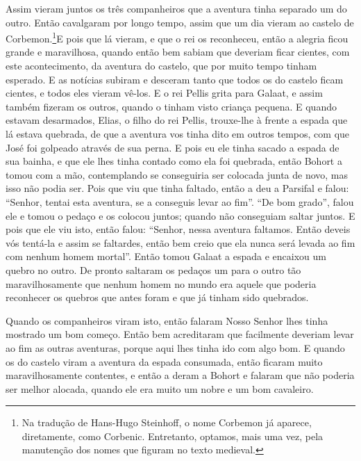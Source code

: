 Assim vieram juntos os três companheiros que a aventura tinha separado um do
outro. Então cavalgaram por longo tempo, assim que um dia vieram ao castelo de
Corbemon.\footnote{ Na tradução de Hans-Hugo Steinhoff, o nome Corbemon já
aparece, diretamente, como Corbenic. Entretanto, optamos, mais uma vez, pela
manutenção dos nomes que figuram no texto medieval.}E pois que lá
vieram, e que o rei os reconheceu, então a alegria ficou grande e maravilhosa,
quando então bem sabiam que deveriam ficar cientes, com este acontecimento, da
aventura do castelo, que por muito tempo tinham esperado. E as notícias subiram
e desceram tanto que todos os do castelo ficam cientes, e todos eles vieram
vê-los. E o rei Pellis grita para Galaat, e assim também fizeram os outros,
quando o tinham visto criança pequena. E quando estavam desarmados, Elias, o
filho do rei Pellis, trouxe-lhe à frente a espada que lá estava quebrada, de
que a aventura vos tinha dito em outros tempos,  com que José foi
golpeado através de sua perna. E pois eu ele tinha sacado a espada de sua
bainha, e que ele lhes tinha contado como ela foi quebrada, então Bohort a
tomou com a mão, contemplando se conseguiria ser colocada junta de novo, mas
isso não podia ser. Pois que viu que tinha faltado, então a deu a Parsifal e
falou: “Senhor, tentai esta aventura, se a conseguis levar ao fim”. “De bom
grado”, falou ele e tomou o pedaço e os colocou juntos; quando não conseguiam
saltar juntos. E pois que ele viu isto, então falou: “Senhor, nessa aventura
faltamos. Então deveis vós tentá-la e assim se faltardes, então bem creio que
ela nunca será levada ao fim com nenhum homem mortal”. Então tomou Galaat a
espada e encaixou um quebro no outro. De pronto saltaram os pedaços um para o
outro tão maravilhosamente que nenhum homem no mundo era aquele que poderia
reconhecer os quebros que antes foram e que já tinham sido quebrados.

Quando os companheiros viram isto, então falaram Nosso Senhor lhes tinha
mostrado um bom começo. Então bem acreditaram que facilmente deveriam levar ao
fim as outras aventuras, porque aqui lhes tinha ido com algo bom. E quando os
do castelo viram a aventura da espada consumada, então ficaram muito
maravilhosamente contentes, e então a deram a Bohort e falaram que não poderia
ser melhor alocada, quando ele era muito um nobre e um bom cavaleiro.

